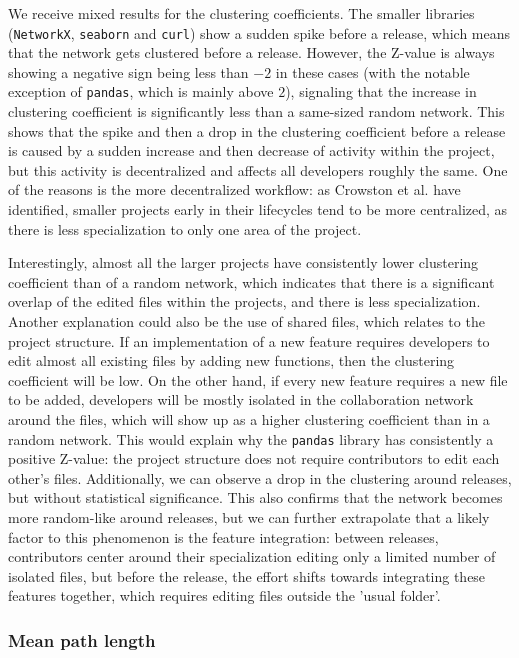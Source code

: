 We receive mixed results for the clustering coefficients. The smaller libraries (\texttt{NetworkX}, \texttt{seaborn} and \texttt{curl}) show a sudden spike before a release, which means that the network gets clustered before a release. However, the Z-value is always showing a negative sign being less than $-2$ in these cases (with the notable exception of \texttt{pandas}, which is mainly above $2$), signaling that the increase in clustering coefficient is significantly less than a same-sized random network. This shows that the spike and then a drop in the clustering coefficient before a release is caused by a sudden increase and then decrease of activity within the project, but this activity is decentralized and affects all developers roughly the same. One of the reasons is the more decentralized workflow: as Crowston et al. \cite{crowstonHierarchyCentralizationFree2006} have identified, smaller projects early in their lifecycles tend to be more centralized, as there is less specialization to only one area of the project.

Interestingly, almost all the larger projects have consistently lower clustering coefficient than of a random network, which indicates that there is a significant overlap of the edited files within the projects, and there is less specialization. Another explanation could also be the use of shared files, which relates to the project structure. If an implementation of a new feature requires developers to edit almost all existing files by adding new functions, then the clustering coefficient will be low. On the other hand, if every new feature requires a new file to be added, developers will be mostly isolated in the collaboration network around the files, which will show up as a higher clustering coefficient than in a random network. This would explain why the \texttt{pandas} library has consistently a positive Z-value: the project structure does not require contributors to edit each other's files. Additionally, we can observe a drop in the clustering around releases, but without statistical significance. This also confirms that the network becomes more random-like around releases, but we can further extrapolate that a likely factor to this phenomenon is the feature integration: between releases, contributors center around their specialization editing only a limited number of isolated files, but before the release, the effort shifts towards integrating these features together, which requires editing files outside the 'usual folder'.

\subsubsection{Mean path length}

